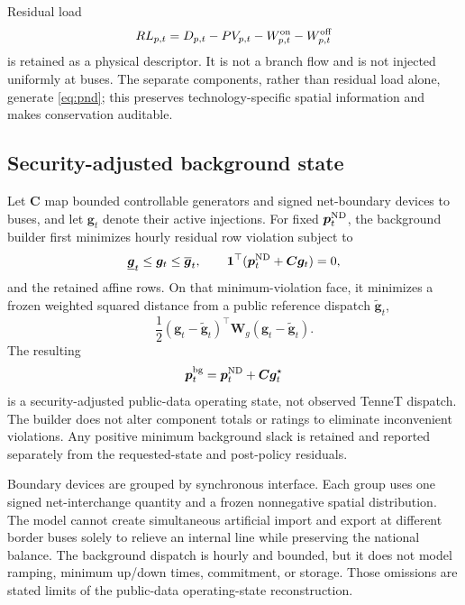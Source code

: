 \documentclass[10pt,journal]{IEEEtran}
\newcommand{\one}{\mathbf{1}}
\begin{document}
Residual load
\begin{equation}
RL_{p,t}=D_{p,t}-PV_{p,t}-W_{p,t}^{\rm on}-W_{p,t}^{\rm off}
\label{eq:residual_load}
\end{equation}
is retained as a physical descriptor. It is not a branch flow and is not injected uniformly at buses. The separate components, rather than residual load alone, generate \eqref{eq:pnd}; this preserves technology-specific spatial information and makes conservation auditable.

\subsection{Security-adjusted background state}

Let $\bm C$ map bounded controllable generators and signed net-boundary devices to buses, and let $\bm g_t$ denote their active injections. For fixed $\bm p_t^{\rm ND}$, the background builder first minimizes hourly residual row violation subject to
\begin{equation}
\underline{\bm g}_t\leq\bm g_t\leq\overline{\bm g}_t,
\qquad
\one^\top(\bm p_t^{\rm ND}+\bm C\bm g_t)=0,
\label{eq:bg_bounds}
\end{equation}
and the retained affine rows. On that minimum-violation face, it minimizes a frozen weighted squared distance from a public reference dispatch $\widetilde{\bm g}_t$,
\begin{equation}
\frac12(\bm g_t-\widetilde{\bm g}_t)^\top
\bm W_g(\bm g_t-\widetilde{\bm g}_t).
\label{eq:bg_stage2}
\end{equation}
The resulting
\begin{equation}
\bm p_t^{\rm bg}=\bm p_t^{\rm ND}+\bm C\bm g_t^\star
\label{eq:pbg}
\end{equation}
is a security-adjusted public-data operating state, not observed TenneT dispatch. The builder does not alter component totals or ratings to eliminate inconvenient violations. Any positive minimum background slack is retained and reported separately from the requested-state and post-policy residuals.

Boundary devices are grouped by synchronous interface. Each group uses one signed net-interchange quantity and a frozen nonnegative spatial distribution. The model cannot create simultaneous artificial import and export at different border buses solely to relieve an internal line while preserving the national balance. The background dispatch is hourly and bounded, but it does not model ramping, minimum up/down times, commitment, or storage. Those omissions are stated limits of the public-data operating-state reconstruction.
\end{document}
